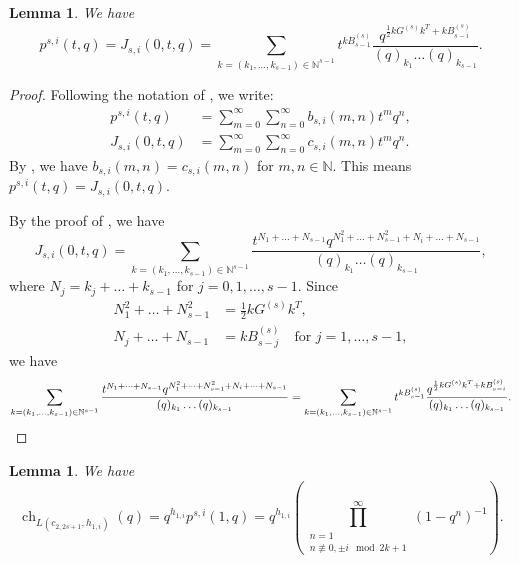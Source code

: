 \documentclass[a4paper, 12pt, reqno]{amsart}
\newtheorem{lemma}[theorem]{Lemma}
\theoremstyle{remark}
\DeclareMathOperator{\ch}{ch}
\begin{document}
\begin{lemma}
  \label{lmm:9}
  We have
  \begin{equation*}
    p^{s, i}(t, q) = J_{s, i}(0, t, q) = \sum_{k = (k_1, \dots, k_{s - 1}) \in \mathbb{N}^{s - 1}}t^{kB^{(s)}_{s - 1}}\frac{q^{\frac{1}{2}kG^{(s)}k^T + kB^{(s)}_{s - i}}}{(q)_{k_1}\dots(q)_{k_{s - 1}}}.
  \end{equation*}
\end{lemma}

\begin{proof}
  Following the notation of \cite[\S7.2]{andrews_theory_1998}, we write:
  \begin{align*}
    p^{s, i}(t, q) &= \sum_{m = 0}^{\infty}\sum_{n = 0}^{\infty}b_{s, i}(m, n)t^mq^n, \\
    J_{s, i}(0, t, q) &= \sum_{m = 0}^{\infty}\sum_{n = 0}^{\infty}c_{s, i}(m, n)t^mq^n.
  \end{align*}
  By \cite[\S7.3]{andrews_theory_1998}, we have $b_{s, i}(m, n) = c_{s, i}(m, n)$ for $m, n \in \mathbb{N}$.
  This means $p^{s, i}(t, q) = J_{s, i}(0, t, q)$.

  By the proof of \cite[Theorem 7.8]{andrews_theory_1998}, we have
  \begin{equation*}
    J_{s, i}(0, t, q) = \sum_{k = (k_1, \dots, k_{s - 1}) \in \mathbb{N}^{s - 1}}\frac{t^{N_1 + \dots + N_{s - 1}}q^{N_1^2 + \dots + N_{s - 1}^2 + N_i + \dots + N_{s - 1}}}{(q)_{k_1}\dots(q)_{k_{s - 1}}},
  \end{equation*}
  where $N_j = k_j + \dots + k_{s - 1}$ for $j = 0, 1, \dots, s - 1$.
  Since
  \begin{align*}
    N_1^2 + \dots + N_{s - 1}^2 &= \frac{1}{2}kG^{(s)}k^T, \\
    N_j + \dots + N_{s - 1} &= kB^{(s)}_{s - j} \quad \text{for $j = 1, \dots, s - 1$},
  \end{align*}
  we have
  \begin{equation*}
    \sum_{k = (k_1, \dots, k_{s - 1}) \in \mathbb{N}^{s - 1}}\frac{t^{N_1 + \dots + N_{s - 1}}q^{N_1^2 + \dots + N_{s - 1}^2 + N_i + \dots + N_{s - 1}}}{(q)_{k_1}\dots(q)_{k_{s - 1}}} = \sum_{k = (k_1, \dots, k_{s - 1}) \in \mathbb{N}^{s - 1}}t^{kB^{(s)}_{s - 1}}\frac{q^{\frac{1}{2}kG^{(s)}k^T + kB^{(s)}_{s - i}}}{(q)_{k_1}\dots(q)_{k_{s - 1}}}. \qedhere
  \end{equation*}
\end{proof}

\begin{lemma}
  \label{lmm:10}
  We have
  \begin{equation*}
    \ch_{L(c_{2, 2s + 1}, h_{1, i})}(q) = q^{h_{1, i}}p^{s, i}(1, q) = q^{h_{1, i}}\left(\prod^{\infty}_{\substack{n = 1 \\ n \not\equiv 0, \pm i \mod 2k + 1}}(1 - q^n)^{-1}\right).
  \end{equation*}
\end{lemma}
\end{document}

